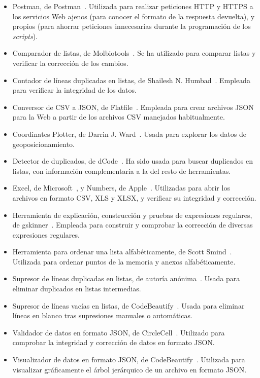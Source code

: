 \begin{itemize}
    \item Postman, de Postman~\cite{postman}. Utilizada para realizar peticiones HTTP y HTTPS a los servicios Web ajenos (para conocer el formato de la respuesta devuelta), y propios (para ahorrar peticiones innecesarias durante la programación de los \textit{scripts}).
    \item Comparador de listas, de Molbiotools~\cite{molbiotools}. Se ha utilizado para comparar listas y verificar la corrección de los cambios.
    \item Contador de líneas duplicadas en listas, de Shailesh N. Humbad~\cite{somacon}. Empleada para verificar la integridad de los datos.
    \item Conversor de CSV a JSON, de Flatfile~\cite{csv2json}. Empleada para crear archivos JSON para la Web a partir de los archivos CSV manejados habitualmente.
    \item Coordinates Plotter, de Darrin J. Ward~\cite{mapmaker}. Usada para explorar los datos de geoposicionamiento.
    \item Detector de duplicados, de dCode~\cite{dcode}. Ha sido usada para buscar duplicados en listas, con información complementaria a la del resto de herramientas.
    \item Excel, de Microsoft~\cite{excel}, y Numbers, de Apple~\cite{numbers}. Utilizadas para abrir los archivos en formato CSV, XLS y XLSX, y verificar su integridad y corrección.
    \item Herramienta de explicación, construcción y pruebas de expresiones regulares, de gskinner~\cite{regexr}. Empleada para construir y comprobar la corrección de diversas expresiones regulares.

    
    \item Herramienta para ordenar una lista alfabéticamente, de Scott Smind~\cite{alfabetico}. Utilizada para ordenar puntos de la memoria y anexos alfabéticamente.
    \item Supresor de líneas duplicadas en listas, de autoría anónima~\cite{dedupelist}. Usada para eliminar duplicados en listas intermedias.
    \item Supresor de líneas vacías en listas, de CodeBeautify~\cite{codebeautify}. Usada para eliminar líneas en blanco tras supresiones manuales o automáticas.
    \item Validador de datos en formato JSON, de CircleCell~\cite{jsonlint}. Utilizado para comprobar la integridad y corrección de datos en formato JSON.
    \item Visualizador de datos en formato JSON, de CodeBeautify~\cite{jsonviewer}. Utilizada para visualizar gráficamente el árbol jerárquico de un archivo en formato JSON.
\end{itemize}

